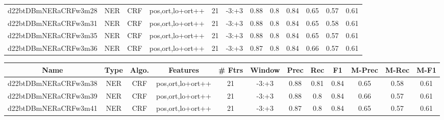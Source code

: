 \documentclass[a4paper]{article}
\begin{document}
\begin{landscape}
\begin{center}
\begin{tabular}{ |c|c|c|c|c|c|c|c|c|c|c|c|}
 	
 
 	
 		
 		\small{ d22btDBmNERaCRFw3m28 } & NER & CRF & pos,ort,lo+ort++  &  21 &  -3:+3  &  0.88 & 0.8 & 0.84  &  0.65 & 0.57 & 0.61 \\
 		

 	
 
 	
 		
 		\small{ d22btDBmNERaCRFw3m31 } & NER & CRF & pos,ort,lo+ort++  &  21 &  -3:+3  &  0.88 & 0.8 & 0.84  &  0.65 & 0.58 & 0.61 \\
 		

 	
 
 	
 		
 		\small{ d22btDBmNERaCRFw3m35 } & NER & CRF & pos,ort,lo+ort++  &  21 &  -3:+3  &  0.88 & 0.8 & 0.84  &  0.65 & 0.57 & 0.61 \\
 		

 	
 
 	
 		
 		\small{ d22btDBmNERaCRFw3m36 } & NER & CRF & pos,ort,lo+ort++  &  21 &  -3:+3  &  0.87 & 0.8 & 0.84  &  0.66 & 0.57 & 0.61 \\
 		
 \hline
\end{tabular}
\end{center}




\begin{center}
\begin{tabular}{ |c|c|c|c|c|c|c|c|c|c|c|c|} 
 \hline
 	Name & Type & Algo. & Features & \# Ftrs & Window & Prec & Rec & F1 & M-Prec & M-Rec & M-F1\\
 \hline

 		

 	
 
 	
 		
 		\small{ d22btDBmNERaCRFw3m38 } & NER & CRF & pos,ort,lo+ort++  &  21 &  -3:+3  &  0.88 & 0.81 & 0.84  &  0.65 & 0.58 & 0.61 \\
 		

 	
 
 	
 		
 		\small{ d22btDBmNERaCRFw3m39 } & NER & CRF & pos,ort,lo+ort++  &  21 &  -3:+3  &  0.88 & 0.8 & 0.84  &  0.66 & 0.57 & 0.61 \\
 		

 	
 
 	
 		
 		\small{ d22btDBmNERaCRFw3m41 } & NER & CRF & pos,ort,lo+ort++  &  21 &  -3:+3  &  0.87 & 0.8 & 0.84  &  0.65 & 0.57 & 0.61 \\
 		


\end{tabular}
\end{center}
\end{landscape}
\end{document}
